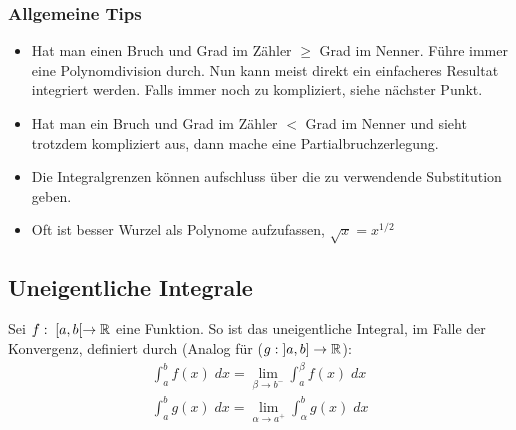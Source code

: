 \subsubsection{Allgemeine Tips}
\begin{itemize}
	\item Hat man einen Bruch und Grad im Zähler $\geq$ Grad im Nenner. Führe immer eine Polynomdivision durch. Nun kann meist direkt ein einfacheres Resultat integriert werden. Falls immer noch zu kompliziert, siehe nächster Punkt.

	\item Hat man ein Bruch und Grad im Zähler $<$ Grad im Nenner und sieht trotzdem kompliziert aus, dann mache eine Partialbruchzerlegung.

	\item Die Integralgrenzen können aufschluss über die zu verwendende Substitution geben.

	\item Oft ist besser Wurzel als Polynome aufzufassen, $\sqrt{x} = x^{1/2}$
\end{itemize}




\subsection{Uneigentliche Integrale}
\begin{definition} Sei $f: \; [a, b[ \to \mathbb{R}$ eine Funktion. So ist das uneigentliche Integral, im Falle der Konvergenz, definiert durch (Analog für ($g: \; ]a, b] \to \mathbb{R}$):\\
\begin{align*}
	\int_a^b f(x) \; dx = \lim_{\beta \to b^-} \int_a^{\beta} f(x)\; dx\\
	\int_a^b g(x) \; dx = \lim_{\alpha \to a^+} \int_{\alpha}^{b} g(x)\; dx
\end{align*}
\end{definition}

